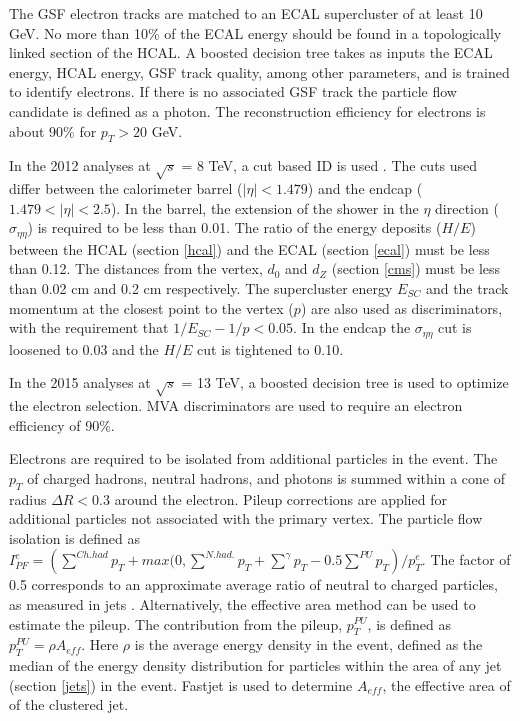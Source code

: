\documentclass[oneside, letterpaper, oldfontcommands]{memoir}
\begin{document}
\qquad The GSF electron tracks are matched to an ECAL supercluster of at least 10 GeV. No more than 10$\%$ of the ECAL energy should be found in a topologically linked section of the HCAL. A boosted decision tree\cite{Hocker:2007ht} takes as inputs the ECAL energy, HCAL energy, GSF track quality, among other parameters, and is trained to identify electrons. If there is no associated GSF track the particle flow candidate is defined as a photon. The reconstruction efficiency for electrons is about 90$\%$ for $p_{T} > 20$ GeV\cite{Khachatryan:2015hwa}.

\qquad In the 2012 analyses at $\sqrt{s}$ = 8 TeV, a cut based ID is used \cite{Khachatryan:2015hwa}. The cuts used differ between the calorimeter barrel ($|\eta| < 1.479$) and the endcap ($1.479 < |\eta| < 2.5$). In the barrel, the extension of the shower in the $\eta$ direction ($\sigma_{\eta\eta}$) is required to be less than 0.01. The ratio of the energy deposits ($H/E$) between the HCAL (section \ref{hcal}) and the ECAL (section \ref{ecal}) must be less than 0.12.    The distances from the vertex, $d_{0}$ and $d_{Z}$ (section \ref{cms}) must be less than 0.02 cm and 0.2 cm respectively. The supercluster energy $E_{SC}$ and the track momentum at the closest point to the vertex ($p$) are also used as discriminators, with the requirement that $1/E_{SC} - 1/p < 0.05$. In the endcap the $\sigma_{\eta\eta}$ cut is loosened to 0.03 and the $H/E$ cut is tightened to 0.10.

\qquad In the 2015 analyses at $\sqrt{s}$ = 13 TeV, a boosted decision tree is used to optimize the electron selection. MVA discriminators are used to require an electron efficiency of 90\%.

\qquad Electrons are required to be isolated from additional particles in the event. The $p_{T}$ of charged hadrons, neutral hadrons, and photons is summed within a cone of radius $\Delta R < 0.3$ around the electron.  Pileup corrections are applied for additional particles not associated with the primary vertex. The particle flow isolation is defined as $I_{PF}^{e} = \left(\sum\limits^{Ch. had} p_{T} + max(0, \sum\limits^{N. had.} p_{T} + \sum\limits^{\gamma} p_{T} - 0.5 \sum\limits^{PU} p_{T}\right)/p_{T}^{e}$. The factor of 0.5 corresponds to an approximate average ratio of neutral to charged particles, as measured in jets \cite{CMS-PAS-PFT-10-002}. Alternatively, the effective area method can be used to estimate the pileup. The contribution from the pileup, $p_{T}^{PU}$, is defined as $p_{T}^{PU} = \rho A_{eff}$. Here $\rho$ is the average energy density in the event, defined as the median of the energy density distribution for particles within the area of any jet (section \ref{jets}) in the event.\cite{Khachatryan:2015hwa} {\sc Fastjet} \cite{Cacciari:2011ma} is used to determine $A_{eff}$, the effective area of of the clustered jet.  
\end{document}

